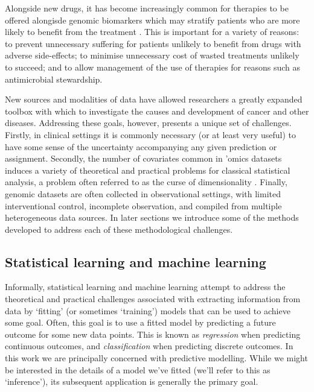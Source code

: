 \documentclass[thesis.tex]{subfiles}
\begin{document}
Alongside new drugs, it has become increasingly common for therapies to be offered alongisde genomic biomarkers which may stratify patients who are more likely to benefit from the treatment \citep{weber_egfr_2014, awad_precision_2019, zhu_association_2019, safarika_29-mrna_2021}. This is important for a variety of reasons: to prevent unnecessary suffering for patients unlikely to benefit from drugs with adverse side-effects; to minimise unnecessary cost of wasted treatments unlikely to succeed; and to allow management of the use of therapies for reasons such as antimicrobial stewardship.

New sources and modalities of data have allowed researchers a greatly expanded
toolbox with which to investigate the causes and development of cancer and other diseases. Addressing these goals, however, presents a unique set of challenges. Firstly, in clinical settings it is commonly necessary (or at least very useful) to have some sense of the uncertainty accompanying any given prediction or assignment. Secondly, the number of covariates common in ’omics datasets induces a variety of theoretical and practical problems for classical statistical analysis, a problem often referred to as the curse of dimensionality \citep{barbour_precision_2019, buhlmann_high-dimensional_2014}. Finally, genomic datasets are often collected in observational settings, with limited interventional control, incomplete observation, and compiled from multiple heterogeneous data sources. In later sections we introduce some of the methods developed to address each of these methodological challenges.

\subsection{Statistical learning and machine learning} 
Informally, statistical learning and machine learning attempt to address the
theoretical and practical challenges associated with extracting information from data by `fitting' (or sometimes `training') models that can be used to achieve some goal.  Often, this goal is to use a fitted model by predicting a future outcome for some new data points. This is known as \emph{regression} when predicting continuous outcomes, and \emph{classification} when predicting discrete outcomes. In this work we are principally concerned with predictive modelling. While we might be interested in the details of a model we've fitted (we'll  refer to this as `inference'), its subsequent application is generally the primary goal.
\end{document}
